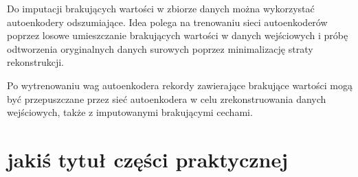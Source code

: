 \documentclass[12pt]{mwbk}
\theoremstyle{plain}
\theoremstyle{definition}
\theoremstyle{remark}
\newcommand\zrodlo[1]{\par\vspace{-3mm}{\small\textit{Źródło: }#1 }}
\begin{document}
Do imputacji brakujących wartości w zbiorze danych można wykorzystać autoenkodery odszumiające. Idea polega na trenowaniu sieci autoenkoderów poprzez losowe umieszczanie brakujących wartości w danych wejściowych i próbę odtworzenia oryginalnych danych surowych poprzez minimalizację straty rekonstrukcji.

Po wytrenowaniu wag autoenkodera rekordy zawierające brakujące wartości mogą być przepuszczane przez sieć autoenkodera w celu zrekonstruowania danych wejściowych, także z imputowanymi brakującymi cechami.


\chapter{jakiś tytuł części praktycznej}




\end{document}
